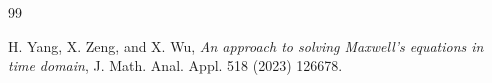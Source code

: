 \documentclass[10pt,reqno]{amsart}
\renewcommand{\(}{\left(}
\renewcommand{\)}{\right)}
\numberwithin{equation}{section}
\begin{document}
\begin{thebibliography}{99}

















{\sc  H. Yang, X. Zeng, and X. Wu}, \emph{An approach to solving Maxwell's equations in time domain}, J. Math. Anal. Appl. 518 (2023) 126678.


\end{thebibliography}
\end{document}
